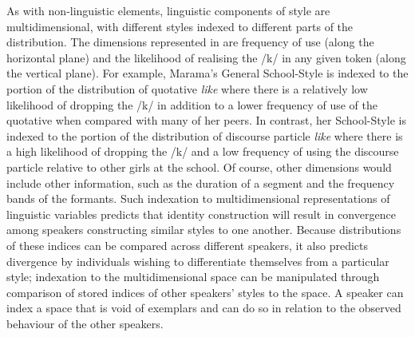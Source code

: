 As with non-linguistic elements, linguistic components of style are multidimensional, with different styles indexed to different parts of the distribution.  The dimensions represented in  are frequency of use (along the horizontal plane) and the likelihood of realising the /k/ in any given token (along the vertical plane). For example, Marama's General School-Style is indexed to the portion of the distribution of quotative \textit{like} where there is a relatively low likelihood of dropping the /k/ in addition to a lower frequency of use of the quotative when compared with many of her peers.  In contrast, her School-Style is indexed to the portion of the distribution of discourse particle \textit{like} where there is a high likelihood of dropping the /k/ and a low frequency of using the discourse particle relative to other girls at the school.  Of course, other dimensions would include other information, such as the duration of a segment and the frequency bands of the formants.  Such indexation to multidimensional representations of linguistic variables predicts that identity construction will result in convergence among speakers constructing similar styles to one another.  Because distributions of these indices can be compared across different speakers, it also predicts divergence by individuals wishing to differentiate themselves from a particular style; indexation to the multidimensional space can be manipulated through comparison of stored indices of other speakers' styles to the space.  A speaker can index a space that is void of exemplars and can do so in relation to the observed behaviour of the other speakers.

